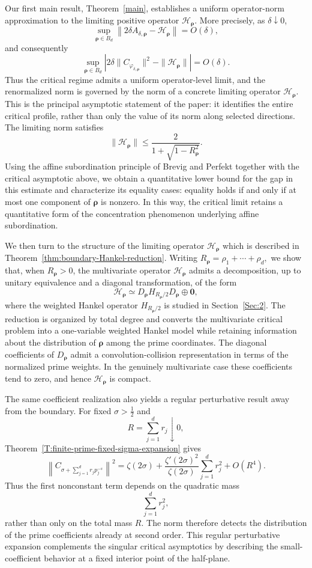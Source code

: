 \documentclass[12pt, reqno]{amsart}
\numberwithin{equation}{section}
\begin{document}
Our first main result, Theorem~\ref{main}, establishes a uniform operator-norm approximation to the limiting positive operator $\mathcal H_{\boldsymbol\rho}$. More precisely, as $\delta\downarrow0$,
\[
\sup_{\boldsymbol\rho\in B_d}
\left\|
2\delta A_{\delta,\boldsymbol\rho}
-
\mathcal H_{\boldsymbol\rho}
\right\|
=
O(\delta),
\]
and consequently
\[
\sup_{\boldsymbol\rho\in B_d}
\left|
2\delta
\|C_{\varphi_{\delta,\boldsymbol\rho}}\|^2
-
\|\mathcal H_{\boldsymbol\rho}\|
\right|
=
O(\delta).
\]
Thus the critical regime admits a uniform operator-level limit, and the
renormalized norm is governed by the norm of a concrete limiting
 operator $\mathcal H_{\boldsymbol\rho}$.  This is the principal asymptotic statement of the paper: it identifies the entire critical profile, rather than only the value of its norm along selected directions.
 The limiting norm satisfies
\[
\|\mathcal H_{\boldsymbol\rho}\|
\le
\frac{2}{1+\sqrt{1-R_{\boldsymbol\rho}^2}}.
\]
Using the affine subordination principle of Brevig and Perfekt together
with the critical asymptotic above, we obtain a quantitative lower bound
for the gap in this estimate and characterize its equality cases: equality
holds if and only if at most one component of
$\boldsymbol\rho$ is nonzero.  In this way, the critical limit retains a quantitative form of the concentration
phenomenon underlying affine subordination.

We then turn to the structure of the limiting operator $\mathcal H_{\boldsymbol\rho}$ which is described in
Theorem~\ref{thm:boundary-Hankel-reduction}. Writing
$R_{\boldsymbol\rho}
= \rho_1+\cdots+\rho_d,$
we show that, when $R_{\boldsymbol\rho}>0$, the multivariate operator
$\mathcal H_{\boldsymbol\rho}$ admits a decomposition, up to unitary
equivalence and a diagonal transformation, of the form
\[
\mathcal H_{\boldsymbol\rho}
\simeq
D_{\boldsymbol\rho}
H_{R_{\boldsymbol\rho}/2}
D_{\boldsymbol\rho}
\oplus\mathbf 0,
\]
where the weighted Hankel operator
$H_{R_{\boldsymbol\rho}/2}$ is studied in Section~\ref{Sec:2}. The
reduction is organized by total degree and converts the multivariate
critical problem into a one-variable weighted Hankel model while
retaining information about the distribution of
$\boldsymbol\rho$ among the prime coordinates. The diagonal coefficients of
$D_{\boldsymbol\rho}$ admit a convolution-collision representation in
terms of the normalized prime weights. In the genuinely multivariate
case these coefficients tend to zero, and hence
$\mathcal H_{\boldsymbol\rho}$ is compact.


The same coefficient realization also yields a regular perturbative
result away from the boundary. For fixed $\sigma>\frac12$ and
\[
R=\sum_{j=1}^d r_j\downarrow0,
\]
Theorem~\ref{T:finite-prime-fixed-sigma-expansion} gives
\[
\left\|
C_{\sigma+\sum_{j=1}^d r_jp_j^{-s}}
\right\|^2
=
\zeta(2\sigma)
+
\frac{\zeta'(2\sigma)^2}{\zeta(2\sigma)}
\sum_{j=1}^d r_j^2
+
O(R^4).
\]
Thus the first nonconstant term depends on the quadratic mass
\[
\sum_{j=1}^d r_j^2,
\]
rather than only on the total mass $R$. The norm therefore detects the
distribution of the prime coefficients already at second order. This
regular perturbative expansion complements the singular critical
asymptotics by describing the small-coefficient behavior at a fixed
interior point of the half-plane.
\end{document}
